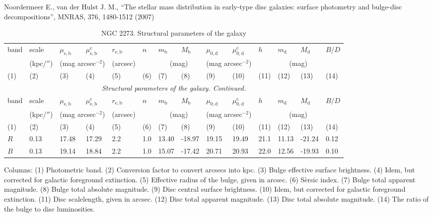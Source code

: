 \documentclass[english,10pt]{article}
\def\mm{\mathrm}
\begin{document}
\noindent
Noordermeer E., van der Hulst J. M., 
``The stellar mass distribution in early-type disc galaxies: surface
photometry and bulge-disc decompositions'', 
MNRAS, 376, 1480-1512 (2007)

\begin{longtable}[c]{llllllllllllll}
\caption{NGC 2273. Structural parameters of the galaxy}\label{GAL}  \\ 
\hline 
band & scale & 
$\mu_\mm{e,b}$ & $\mu_\mm{e,b}^\mm{c}$ & $r_\mm{e,b}$ & 
$n$ & $m_\mm{b}$ & $M_\mm{b}$ & 
$\mu_\mm{0,d}$ & $\mu_\mm{0,d}^\mm{c}$ & $h$ & 
$m_\mm{d}$ & $M_\mm{d}$ & $B/D$ \\ 
& (kpc/$''$) & \multicolumn{2}{c}{(mag arcsec$^{-2}$)} & (arcsec) 
& & \multicolumn{2}{c}{(mag)} & 
\multicolumn{2}{c}{(mag arcsec$^{-2}$)} & & 
\multicolumn{2}{c}{(mag)} & \\
(1)&(2)&(3)&(4)&(5)&(6)&(7)&(8)&(9)&(10)&(11)&(12)&(13)&(14) \\ 
\hline
\endfirsthead 
\hline
\multicolumn{14}{c}{\small\slshape Structural parameters of the galaxy. 
Continued. } \\ \hline
band & scale & 
$\mu_\mm{e,b}$ & $\mu_\mm{e,b}^\mm{c}$ & $r_\mm{e,b}$ & 
$n$ & $m_\mm{b}$ & $M_\mm{b}$ & 
$\mu_\mm{0,d}$ & $\mu_\mm{0,d}^\mm{c}$ & $h$ & 
$m_\mm{d}$ & $M_\mm{d}$ & $B/D$ \\ 
& (kpc/$''$) & \multicolumn{2}{c}{(mag arcsec$^{-2}$)} & (arcsec) 
& & \multicolumn{2}{c}{(mag)} & 
\multicolumn{2}{c}{(mag arcsec$^{-2}$)} & & 
\multicolumn{2}{c}{(mag)} & \\
(1)&(2)&(3)&(4)&(5)&(6)&(7)&(8)&(9)&(10)&(11)&(12)&(13)&(14) \\
\hline
\endhead 
\hline
$R$ & 0.13 & 17.48 & 17.29 & 2.2 & 1.0 & 13.40 & -18.97 & 
19.15 & 19.49 & 21.1 & 11.13 & -21.24 & 0.12 \tabularnewline

$B$ & 0.13 & 19.14 & 18.84 & 2.2 & 1.0 & 15.07 & -17.42 & 
20.71 & 20.93 & 22.0 & 12.56 & -19.93 & 0.10 \tabularnewline
\hline
\end{longtable}

Columns: 
(1) Photometric band. 
(2) Conversion factor to convert arcsecs into kpc.
(3) Bulge effective surface brightness. 
(4) Idem, but corrected for galactic foreground extinction.
(5) Effective radius of the bulge, given in arcsec.
(6) S\`ersic index. 
(7) Bulge total apparent magnitude.
(8) Bulge total absolute magnitude.
(9) Disc central surface brightness. 
(10) Idem, but corrected for galactic foreground extinction.
(11) Disc scalelength, given in arcsec.
(12) Disc total apparent magnitude.
(13) Disc total absolute magnitude. 
(14) The ratio of the bulge to disc luminosities. 
\end{document}

